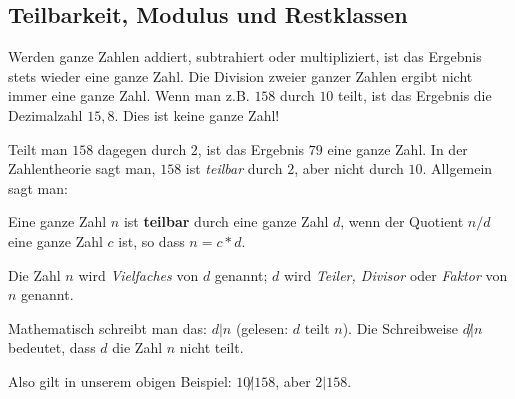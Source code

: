 \begin{refsegment}
\section[Teilbarkeit, Modulus und Restklassen]
        {Teilbarkeit, Modulus und Restklassen\footnotemark}
{} 
Werden ganze Zahlen addiert, subtrahiert oder multipliziert, ist das
Ergebnis stets wieder eine ganze Zahl.
Die Division zweier ganzer Zahlen ergibt nicht immer eine ganze Zahl. Wenn
man z.B. $158$ durch $10$ teilt, ist das Ergebnis die Dezimalzahl $15,8$.
Dies ist keine ganze Zahl!

Teilt man $158$ dagegen durch $2$, ist das Ergebnis $79$ eine ganze Zahl.
In der Zahlentheorie sagt man, $158$ ist {\em teilbar} durch $2$, aber nicht durch $10$.
Allgemein sagt man:

\begin{definition}\label{def-zth-divisibility} 
Eine ganze Zahl $n$ ist \textbf{teilbar} durch eine ganze Zahl $d$, wenn der
Quotient $n/d$ eine ganze Zahl $c$ ist, so dass $n = c * d$.
\end{definition}

Die Zahl $n$ wird {\em Vielfaches} von $d$ genannt; $d$ wird {\em Teiler,
Divisor}   oder  {\em Faktor} von
$n$ genannt.

Mathematisch schreibt man das: $d | n$ (gelesen: \glqq  $d$ teilt $n$\grqq).
Die Schreibweise $d \!\!\not| n$ bedeutet, dass $d$ die Zahl $n$ nicht teilt.

Also gilt in unserem obigen Beispiel: $10\!\!\not| 158$, aber $2 | 158$.



\end{refsegment}
